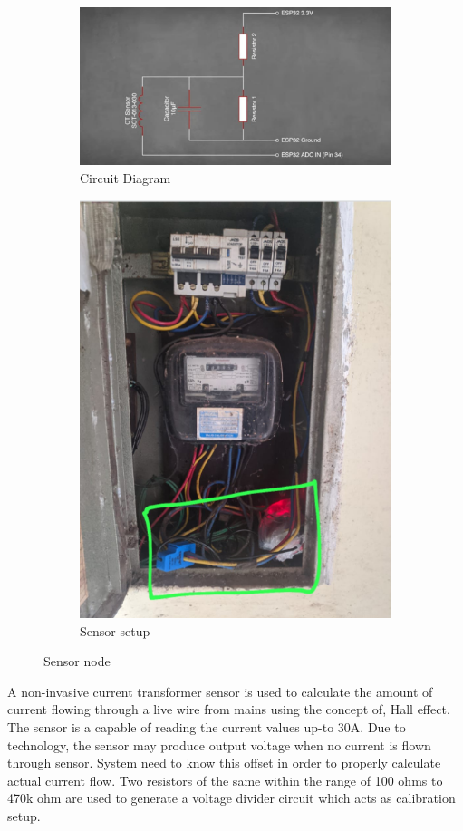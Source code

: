 \documentclass[12 pt]{report}
\begin{document}
\begin{figure}[ht]
\begin{subfigure}{.5\textwidth}
  \centering
  \includegraphics[width=1.05\linewidth,frame]{images/circuit.png}  
  \caption{Circuit Diagram}
  \label{fig:Circuit Diagram}
\end{subfigure}
\begin{subfigure}{.5\textwidth}
  \centering
  \includegraphics[width=.7\linewidth]{images/setup.png}  
  \caption{Sensor setup}
  \label{fig:Sensor setup}
\end{subfigure}
\caption{Sensor node}
\label{fig:Sensor node}
\end{figure}
A non-invasive current transformer sensor is used to calculate the amount of current flowing through a live wire from mains using the concept of, Hall effect. The sensor is a capable of reading the current values up-to 30A. Due to technology, the sensor may produce output voltage when no current is flown through sensor. System need to know this offset in order to properly calculate actual current flow. Two resistors of the same within the range of 100 ohms to 470k ohm are used to generate a voltage divider circuit which acts as calibration setup.
\end{document}
